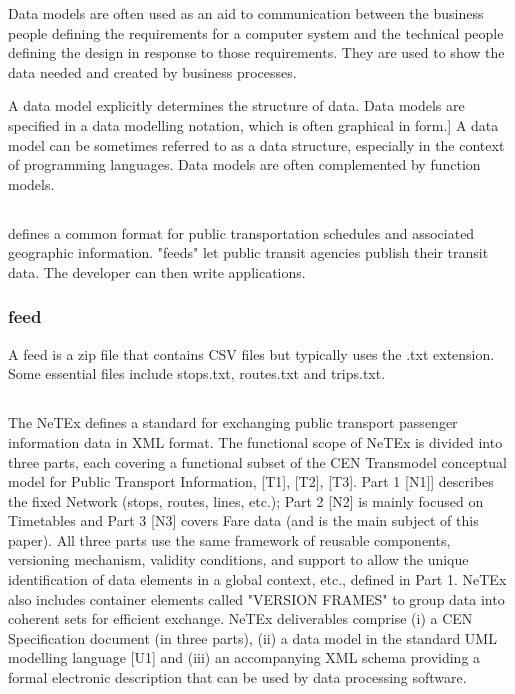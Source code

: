 Data models are often used as an aid to communication between the business people defining the requirements for a computer system and the technical people defining the design in response to those requirements. They are used to show the data needed and created by business processes.
 
A data model explicitly determines the structure of data. Data models are specified in a data modelling notation, which is often graphical in form.]
A data model can be sometimes referred to as a data structure, especially in the context of programming languages. Data models are often complemented by function models.
\subsection{}
 defines a common format for public transportation schedules and associated geographic information. "feeds" let public transit agencies publish their transit data. The developer can then write applications.
\subsubsection{ feed}
A feed is a zip file that contains CSV files but typically uses the .txt extension. Some essential files include stops.txt, routes.txt and trips.txt.


\subsection{}
The NeTEx defines a standard for exchanging public transport passenger information data in XML format. The functional
scope of NeTEx is divided into three parts, each covering a functional subset of the CEN Transmodel conceptual
model for Public Transport Information, [T1], [T2], [T3].
Part 1 [N1]] describes the fixed Network (stops, routes, lines, etc.); Part 2 [N2] is mainly focused on Timetables and
Part 3 [N3] covers Fare data (and is the main subject of this paper). All three parts use the same framework of reusable
components, versioning mechanism, validity conditions, and support to allow the unique identification of data elements
in a global context, etc., defined in Part 1. NeTEx also includes container elements called "VERSION FRAMES"
to group data into coherent sets for efficient exchange.
NeTEx deliverables comprise (i) a CEN Specification document (in three parts), (ii) a data model in the standard UML
modelling language [U1] and (iii) an accompanying XML schema providing a formal electronic description that can
be used by data processing software.

